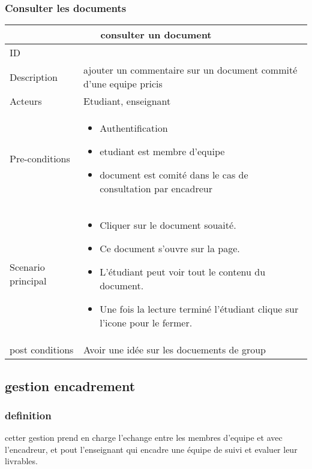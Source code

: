 \documentclass[11pt,fleqn]{book} %
\begin{document}
\subsubsection{Consulter les documents}
\begin{center}
\begin{tabularx}{1\textwidth} { | p{4cm} | >{\raggedright\arraybackslash}X |  }
  \hline
  \multicolumn{2}{|c|}{consulter un document} \\
 \hline
 ID & 5  \\
 \hline
 Description  &  ajouter un commentaire sur un document commité d'une equipe pricis  \\
  \hline
 Acteurs  & Etudiant, enseignant   \\
  \hline
 Pre-conditions  & \begin{itemize}
     \item Authentification
     \item etudiant est membre d'equipe
     \item document est comité dans le cas de consultation par encadreur
 \end{itemize}\\
 \hline
 Scenario principal  &  
\begin{itemize}
     \item Cliquer sur le document souaité.
     \item Ce document s’ouvre sur la page.
     \item L’étudiant peut voir tout le contenu du document.
     \item Une fois la lecture terminé l’étudiant clique sur l’icone pour le fermer.

 \end{itemize}\\
  \hline
 post conditions  &  Avoir une idée sur les docuements de group  \\
  \hline
\end{tabularx}
\label{tbl:nicetablelesstable}
\end{center}

\newpage
\subsection{gestion encadrement}

\subsubsection{definition}
cetter gestion prend en charge l'echange entre les membres d'equipe et avec l'encadreur, et pout l'enseignant qui encadre une équipe de suivi et evaluer leur livrables.
\end{document}
